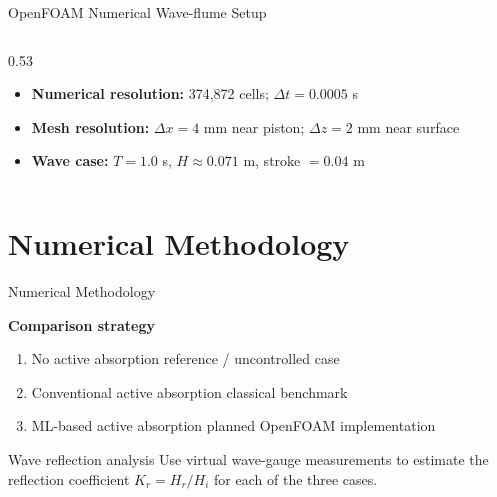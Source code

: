 \documentclass[aspectratio=43,11pt]{beamer}
\newcommand{\subtle}[1]{{\scriptsize\color{metugray}#1}}
\begin{document}
\begin{frame}[t]{OpenFOAM Numerical Wave-flume Setup}
\begin{columns}[T,onlytextwidth]
\begin{column}{0.53\textwidth}
\begin{itemize}
    \item \textbf{Numerical resolution:} 374,872 cells; $\Delta t = 0.0005$ s
    \item \textbf{Mesh resolution:} $\Delta x = 4$ mm near piston; $\Delta z = 2$ mm near surface
    \item \textbf{Wave case:} $T = 1.0$ s, $H \approx 0.071$ m, stroke $= 0.04$ m
\end{itemize}
\end{column}
\end{columns}
\end{frame}

\section{Numerical Methodology}
\begin{frame}[t]{Numerical Methodology}
\begin{center}
\end{center}
\vspace{4mm}
\textbf{Comparison strategy}
\begin{enumerate}\setlength{\itemsep}{4pt}
  \item No active absorption \hfill \subtle{reference / uncontrolled case}
  \item Conventional active absorption \hfill \subtle{classical benchmark}
  \item ML-based active absorption \hfill \subtle{planned OpenFOAM implementation}
\end{enumerate}
\vspace{3mm}
\begin{block}{Wave reflection analysis}
  Use virtual wave-gauge measurements to estimate
  the reflection coefficient $K_r=H_r/H_i$
  for each of the three cases.
\end{block}
\end{frame}
\end{document}
